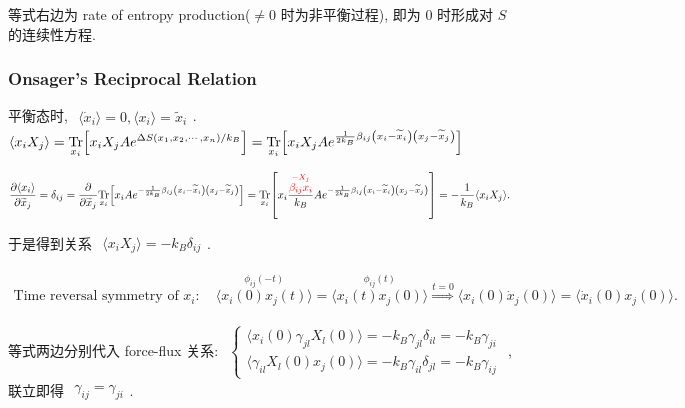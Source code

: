 \documentclass[../../main.tex]{subfiles}
\begin{document}
等式右边为 rate of entropy production($\neq 0$ 时为非平衡过程), 即为 0 时形成对 $S$ 的连续性方程. 

\subsubsection{Onsager's Reciprocal Relation}
平衡态时, $\begin{aligned}
    \langle \dot{x}_{i}\rangle = 0, \langle x_{i}\rangle = \widetilde{x}_{i}
\end{aligned}$. $\begin{aligned}
    \langle x_{i}X_{j}\rangle 
    = \underset{x_{i}}{\operatorname{Tr}}{\left[x_{i}X_{j}Ae^{\Delta S(x_{1},x_{2},\cdots,x_{n})/k_{B}}\right]} 
    = \underset{x_{i}}{\operatorname{Tr}}{\left[x_{i}X_{j}Ae^{\frac{1}{2k_{B}}\beta_{ij}\left(x_{i}-\widetilde{x}_{i}\right)\left(x_{j}-\widetilde{x}_{j}\right)}\right]}
\end{aligned}$

$\begin{aligned}
    \frac{\partial\langle x_{i}\rangle}{\partial \widetilde{x}_{j}} 
    = \delta_{ij} 
    = \frac{\partial}{\partial\widetilde{x}_{j}}
    \underset{x_{i}}{\operatorname{Tr}}
    {\left[
        x_{i}
        Ae^{-\frac{1}{2k_{B}}\beta_{ij}\left(x_{i}-\widetilde{x}_{i}\right)\left(x_{j}-\widetilde{x}_{j}\right)}
    \right]} 
    = \underset{x_{i}}{\operatorname{Tr}}
    {\left[
        x_{i}\frac{
            \stackrel{{\color{red}{-X_{j}}}}{{\color{red}{\beta_{ij}x_{i}}}}
            }{k_{B}}
        Ae^{-\frac{1}{2k_{B}}\beta_{ij}\left(x_{i}-\widetilde{x}_{i}\right)\left(x_{j}-\widetilde{x}_{j}\right)}
        \right]} = -\frac{1}{k_{B}}\langle x_{i}X_{j}\rangle. 
\end{aligned}$

于是得到关系 $\begin{aligned}
    \boxed{\langle x_{i}X_{j}\rangle = -k_{B}\delta_{ij}}
\end{aligned}$. 

$\begin{aligned}
    \text{Time reversal symmetry of }x_{i}: \quad\stackrel{\phi_{ij}(-t)}{\langle x_{i}(0)x_{j}(t)\rangle} = \stackrel{\phi_{ij}(t)}{\langle x_{i}(t)x_{j}(0)\rangle}\stackrel{t=0}{\Longrightarrow}\langle x_{i}(0)\dot{x}_{j}(0)\rangle = \langle\dot{x}_{i}(0)x_{j}(0)\rangle.
\end{aligned}$ 

等式两边分别代入 force-flux 关系: $\begin{aligned}
    \left\{\begin{aligned}
        \langle x_{i}(0)\gamma_{jl}X_{l}(0)\rangle = -k_{B}\gamma_{jl}\delta_{il} = -k_{B}\gamma_{ji}\\
        \langle\gamma_{il}X_{l}(0)x_{j}(0)\rangle = -k_{B}\gamma_{il}\delta_{jl} = -k_{B}\gamma_{ij}
    \end{aligned}\right.
\end{aligned}$, 联立即得 $\begin{aligned}
    \boxed{\gamma_{ij} = \gamma_{ji}}
\end{aligned}$. 
\end{document}
